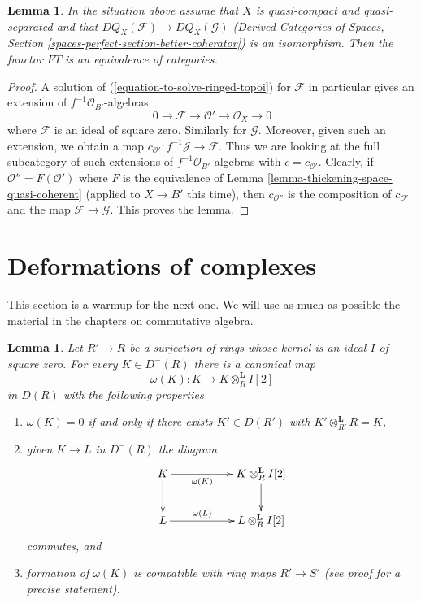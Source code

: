 \documentclass{stacks-project}
\theoremstyle{plain}
\newtheorem{lemma}[subsection]{Lemma}
\theoremstyle{definition}
\theoremstyle{remark}
\numberwithin{equation}{subsection}
\begin{document}
\begin{lemma}
\label{lemma-thickening-over-thickening-space-quasi-coherent}
In the situation above assume that $X$ is quasi-compact and quasi-separated
and that $DQ_X(\mathcal{F}) \to DQ_X(\mathcal{G})$
(Derived Categories of Spaces, Section
\ref{spaces-perfect-section-better-coherator})
is an isomorphism. Then the functor $FT$ is an equivalence of categories.
\end{lemma}

\begin{proof}
A solution of (\ref{equation-to-solve-ringed-topoi}) for $\mathcal{F}$
in particular gives an extension of $f^{-1}\mathcal{O}_{B'}$-algebras
$$
0 \to \mathcal{F} \to \mathcal{O}' \to \mathcal{O}_X \to 0
$$
where $\mathcal{F}$ is an ideal of square zero. Similarly for $\mathcal{G}$.
Moreover, given such an extension, we obtain a map
$c_{\mathcal{O}'} : f^{-1}\mathcal{J} \to \mathcal{F}$.
Thus we are looking at the full subcategory of such extensions
of $f^{-1}\mathcal{O}_{B'}$-algebras with $c = c_{\mathcal{O}'}$.
Clearly, if $\mathcal{O}'' = F(\mathcal{O}')$ where
$F$ is the equivalence of Lemma \ref{lemma-thickening-space-quasi-coherent}
(applied to $X \to B'$ this time),
then $c_{\mathcal{O}''}$ is the composition of
$c_{\mathcal{O}'}$ and the map $\mathcal{F} \to \mathcal{G}$.
This proves the lemma.
\end{proof}





\section{Deformations of complexes}
\label{section-deformations-complexes}

\noindent
This section is a warmup for the next one.
We will use as much as possible the material
in the chapters on commutative algebra.

\begin{lemma}
\label{lemma-canonical-class-algebra}
Let $R' \to R$ be a surjection of rings whose kernel is an ideal
$I$ of square zero. For every $K \in D^-(R)$ there is a canonical
map
$$
\omega(K) : K \longrightarrow K \otimes_R^\mathbf{L} I[2]
$$
in $D(R)$ with the following properties
\begin{enumerate}
\item $\omega(K) = 0$ if and only if there exists
$K' \in D(R')$ with $K' \otimes_{R'}^\mathbf{L} R = K$,
\item given $K \to L$ in $D^-(R)$ the diagram
$$
\xymatrix{
K \ar[d] \ar[rr]_-{\omega(K)} & &
K \otimes^\mathbf{L}_R I[2] \ar[d] \\
L \ar[rr]^-{\omega(L)} & &
L \otimes^\mathbf{L}_R I[2]
}
$$
commutes, and
\item formation of $\omega(K)$ is compatible with ring maps $R' \to S'$
(see proof for a precise statement).
\end{enumerate}
\end{lemma}
\end{document}
